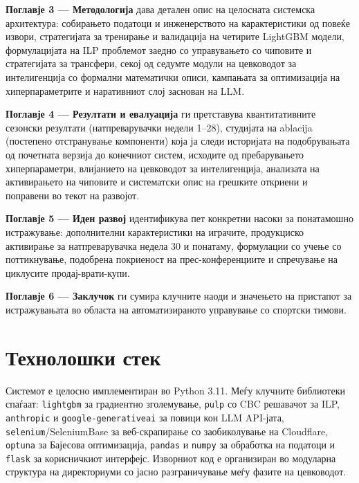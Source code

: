 \textbf{Поглавје 3 — Методологија} дава детален опис на целосната системска архитектура: собирањето податоци и инженерството на карактеристики од повеќе извори, стратегијата за тренирање и валидација на четирите LightGBM модели, формулацијата на ILP проблемот заедно со управувањето со чиповите и стратегијата за трансфери, секој од седумте модули на цевководот за интелигенција со формални математички описи, кампањата за оптимизација на хиперпараметрите и наративниот слој заснован на LLM.

\textbf{Поглавје 4 — Резултати и евалуација} ги претставува квантитативните сезонски резултати (натпреварувачки недели 1--28), студијата на ablacija (постепено отстранување компоненти) која ја следи историјата на подобрувањата од почетната верзија до конечниот систем, исходите од пребарувањето хиперпараметри, влијанието на цевководот за интелигенција, анализата на активирањето на чиповите и систематски опис на грешките откриени и поправени во текот на развојот.

\textbf{Поглавје 5 — Иден развој} идентификува пет конкретни насоки за понатамошно истражување: дополнителни карактеристики на играчите, продукциско активирање за натпреварувачка недела 30 и понатаму, формулации со учење со поттикнување, подобрена покриеност на прес-конференциите и спречување на циклусите продај-врати-купи.

\textbf{Поглавје 6 — Заклучок} ги сумира клучните наоди и значењето на пристапот за истражувањата во областа на автоматизираното управување со спортски тимови.

\section{Технолошки стек}

Системот е целосно имплементиран во Python 3.11. Меѓу клучните библиотеки спаѓаат: \texttt{lightgbm} за градиентно зголемување, \texttt{pulp} со CBC решавачот за ILP, \texttt{anthropic} и \texttt{google-generativeai} за повици кон LLM API-јата, \texttt{selenium}/SeleniumBase за веб-скрапирање со заобиколување на Cloudflare, \texttt{optuna} за Бајесова оптимизација, \texttt{pandas} и \texttt{numpy} за обработка на податоци и \texttt{flask} за корисничкиот интерфејс. Изворниот код е организиран во модуларна структура на директориуми со јасно разграничување меѓу фазите на цевководот.
